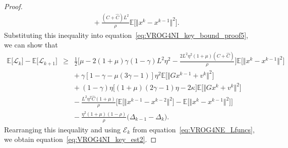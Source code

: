 \documentclass[10pt,a4paper]{amsart}
\def\eqref#1{equation~\ref{#1}}
\newcommand{\Ec}{\mathcal{E}}
\newcommand{\Expk}[1]{\mathbb{E}\big[#1\big]}
\newcommand{\Lc}{\mathcal{L}}
\newcommand{\norms}[1]{\Vert#1\Vert}
\begin{document}
\begin{proof}
\begin{equation*}
\begin{array}{lcl}
&& + {~}  \frac{(C + \hat{C})L^2}{ \rho }  \Expk{ \norms{x^{k} - x^{k-1}}^2 }.
\end{array}
\end{equation*}
Substituting this inequality into \eqref{eq:VROG4NI_key_bound_proof5}, we can show that
\begin{equation*} 
\begin{array}{lcl}
\Expk{ \Lc_k } - \Expk{ \Lc_{k+1} } & \geq &  \frac{1}{2} \Big[ \mu -  2(1+\mu)\gamma(1-\gamma)L^2\eta^2 - \frac{2L^2\eta^2(1+\mu)(C + \hat{C})}{ \rho } \Big] \Expk{ \norms{x^k - x^{k-1}}^2 } \\
&& + {~} \gamma[ 1 - \gamma  - \mu(3\gamma-1)]\eta^2 \Expk{ \norms{Gx^{k-1} + v^k }^2 }  \\
&& + {~} (1-\gamma)\eta \big[  (1+\mu)(2\gamma - 1)\eta - 2\kappa \big]  \Expk{ \norms{Gx^k + v^k}^2 } \\
&& - {~} \frac{L^2\eta^2\hat{C}(1+\mu)}{ \rho } \Big[ \Expk{ \norms{x^{k-1} - x^{k-2}}^2 }  - \Expk{ \norms{x^k - x^{k-1}}^2 } \Big] \\
&& - {~} \frac{\eta^2(1+\mu)(1-\rho)}{\rho} \big( \Delta_{k-1} - \Delta_{k} \big).
\end{array}
\end{equation*}
Rearranging this inequality and using $\Ec_k$ from \eqref{eq:VROG4NE_Lfuncs}, we obtain \eqref{eq:VROG4NI_key_est2}.
\end{proof}
\end{document}
